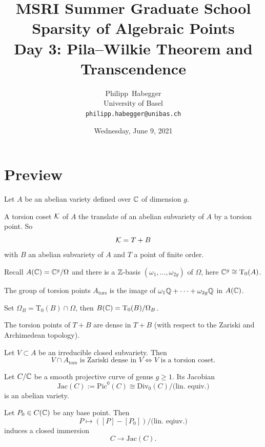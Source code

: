 \documentclass{beamer}
\title{MSRI Summer Graduate School \\ Sparsity of Algebraic Points \\
  Day 3: Pila--Wilkie Theorem and Transcendence}
\author{Philipp~Habegger \\ University of Basel \\ \texttt{philipp.habegger@unibas.ch}}
\date{Wednesday, June 9, 2021}
\begin{document}
\setlength{\abovecaptionskip}{0pt} 
\setlength{\belowcaptionskip}{0pt} 

\renewcommand{\figurename}{Fig.}


\begin{frame}
  \titlepage
\end{frame}
\section{Preview}
\begin{frame}
  Let $A$ be an abelian variety defined over ${\mathbb{C}}$ of dimension $g$. 
  \begin{definition}
    A \alert{torsion coset} ${\mathcal K}$ of $A$
    the translate of an
    abelian subvariety of $A$ by a torsion point. So
    $$ {\mathcal K} = T+B $$
    with $B$ an abelian subvariety of $A$ and $T$ a point of finite order. 
  \end{definition}

  Recall $A({\mathbb{C}}) = {\mathbb{C}}^g / \Omega$ and there is a ${\mathbb{Z}}$-basis
  $(\omega_1,\ldots,\omega_{2g})$ of $\Omega$, here ${\mathbb{C}}^{g} \cong
  \mathrm{T}_0(A)$. 

  The group of torsion points $A_{\mathrm{tors}}$ is the image
  of $\omega_1{\mathbb{Q}}+\cdots+\omega_{2g}{\mathbb{Q}}$  in $A({\mathbb{C}})$.

  Set $\Omega_B = \mathrm{T}_0(B)\cap \Omega$, then $B({\mathbb{C}}) =
  \mathrm{T}_0(B) / \Omega_B$.

  The torsion points of $T+B$ are
  \alert{dense} in $T+B$ (with respect to the Zariski \alert{and}
  Archimedean topology).   
\end{frame}

\begin{frame}
  \begin{theorem}
    Let $V\subset A$ be an irreducible closed subvariety. Then
    \begin{equation*}
      V\cap A_{\mathrm{tors}} \text{ is Zariski dense in $V$}
      \Longleftrightarrow \text{$V$ is a torsion coset.}
    \end{equation*}
  \end{theorem}

  Let $C/{\mathbb{C}}$ be a smooth projective curve of genus $g\ge 1$. Its
  \alert{Jacobian}
  $$\mathrm{Jac}(C):=\mathrm{Pic}^0(C)\cong
  \mathrm{Div}_0(C)/\text{(lin. equiv.)}$$
  is an abelian variety.

  Let $P_0\in C({\mathbb{C}})$ be any base point. Then
  \begin{equation*}
    P\mapsto ([P]-[P_0])/\text{(lin. eqiuv.)} 
  \end{equation*}
  induces a closed immersion
  \begin{equation*}
    C\rightarrow \mathrm{Jac}(C).
  \end{equation*}
\end{frame}  
\end{document}
